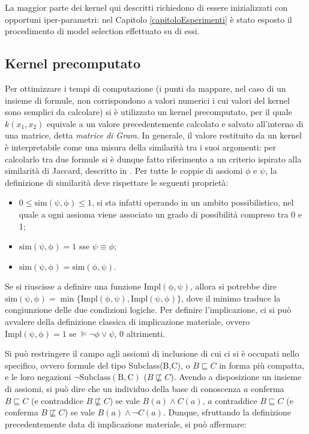 \documentclass[12pt,a4paper]{report}
\begin{document}
La maggior parte dei kernel qui descritti richiedono di essere inizializzati con opportuni iper-parametri: nel Capitolo \ref{capitoloEsperimenti} è stato esposto il procedimento di model selection effettuato su di essi.

\subsection{Kernel precomputato}
\label{jaccardSection}
Per ottimizzare i tempi di computazione (i punti da mappare, nel caso di un insieme di formule, non corrispondono a valori numerici i cui valori del kernel sono semplici da calcolare) si è utilizzato un kernel precomputato, per il quale  $k(x_1,x_2)$ equivale a un valore precedentemente calcolato e salvato all'interno di una matrice, detta \emph{matrice di Gram}.
In generale, il valore restituito da un kernel è interpretabile come una misura della similarità tra i suoi argomenti: per calcolarlo tra due formule si è dunque fatto riferimento a un criterio ispirato alla similarità di Jaccard, descritto in \cite{sacpaper}.
Per tutte le coppie di assiomi $\phi$ e $\psi$, la definizione di similarità deve rispettare le seguenti proprietà:
\begin{itemize}
\item $0 \leq \mathrm{sim(\psi, \phi)} \leq 1$, si sta infatti operando in un ambito possibilistico, nel quale a ogni assioma viene associato un grado di possibilità compreso tra 0 e 1;
\item $\mathrm{sim(\psi, \phi)} = 1$ sse $\psi \equiv \phi $;
\item $\mathrm{sim(\psi, \phi)} = \mathrm{sim(\phi,\psi)}$.
\end{itemize}
Se si riuscisse a definire una funzione $\mathrm{Impl(\phi,\psi)}$, allora si potrebbe dire $\mathrm{sim(\psi, \phi)} = \min \{\mathrm{Impl(\phi,\psi)}, \mathrm{Impl(\psi,\phi)}\}$, dove il minimo traduce la congiunzione delle due condizioni logiche.
Per definire l'implicazione, ci si può avvalere della definizione classica di implicazione materiale, ovvero $\mathrm{Impl(\psi,\phi)} = 1$ se $\models \lnot \phi \lor \psi$, 0 altrimenti.


Si può restringere il campo agli assiomi di inclusione di cui ci si è occupati nello specifico, ovvero formule del tipo Subclass(B,C), o 	$B \sqsubseteq C$ in forma più compatta, e le loro negazioni \emph{ $\lnot \mathrm{Subclass(B,C)}$} ({$ B \not\sqsubseteq C$}).
Avendo a disposizione un insieme di assiomi, si può dire che un individuo della base di conoscenza $a$ conferma $B \sqsubseteq C$ (e contraddice  {$ B \not\sqsubseteq C$}) se vale $B(a) \land C(a)$, $a$ contraddice  $B \sqsubseteq C$ (e conferma {$ B \not\sqsubseteq C$}) se vale $B(a) \land \lnot C(a)$.
Dunque, sfruttando la definizione precedentemente data di implicazione materiale, si può affermare:
\end{document}
